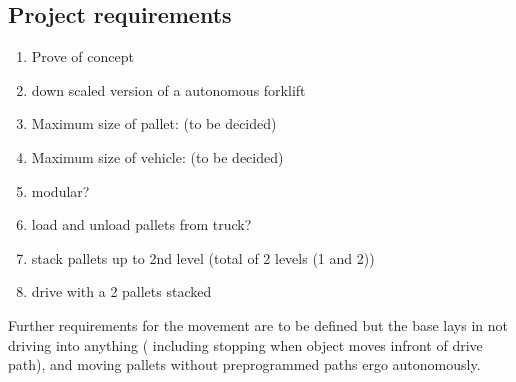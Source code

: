 \documentclass[../report.tex]{subfiles}
\begin{document}
\subsection{Project requirements}
\begin{enumerate}
    \item Prove of concept
    \item down scaled version of a autonomous forklift
    \item Maximum size of pallet: (to be decided)
    \item Maximum size of vehicle: (to be decided)
    \item modular?
    \item load and unload pallets from truck?
    \item stack pallets up to 2nd level (total of 2 levels (1 and 2))
    \item drive with a 2 pallets stacked
\end{enumerate}
Further requirements for the movement are to be defined but the base lays in not driving
into anything ( including stopping when object moves infront of drive path), and moving
pallets without preprogrammed paths ergo autonomously.
\end{document}
